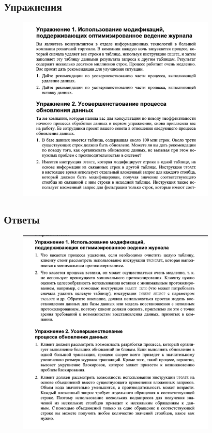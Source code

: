 \newpage
\subsection*{Упражнения}

\begin{figure}[h!]
	\begin{center}
		\includegraphics[width=0.9\textwidth]{img/ex16.png}
	\end{center}
	\captionsetup{justification=centering}
\end{figure}

\subsection*{Ответы}

\begin{figure}[h!]
	\begin{center}
		\includegraphics[width=0.9\textwidth]{img/eans16.png}
	\end{center}
	\captionsetup{justification=centering}
\end{figure}





